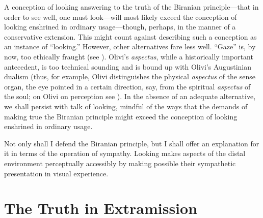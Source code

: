 A conception of looking answering to the truth of the Biranian principle---that in order to see well, one must look---will most likely exceed the conception of looking enshrined in ordinary usage---though, perhaps, in the manner of a conservative extension. This might count against describing such a conception as an instance of ``looking.'' However, other alternatives fare less well. ``Gaze'' is, by now, too ethically fraught (see \citealt{Jay:1994aa}). Olivi's \emph{aspectus}, while a historically important antecedent, is too technical sounding and is bound up with Olivi's Augustinian dualism (thus, for example, Olivi distinguishes the physical \emph{aspectus} of the sense organ, the eye pointed in a certain direction, say, from the spiritual \emph{aspectus} of the soul; on Olivi on perception see \citealt{Pasnau:1997aa,Silva:2010zh,Toivanen:2013ul}). In the absence of an adequate alternative, we shall persist with talk of looking, mindful of the ways that the demands of making true the Biranian principle might exceed the conception of looking enshrined in ordinary usage.

Not only shall I defend the Biranian principle, but I shall offer an explanation for it in terms of the operation of sympathy. Looking makes aspects of the distal environment perceptually accessibly by making possible their sympathetic presentation in visual experience.


\section{The Truth in Extramission} %
\label{sec:the_truth_in_extramission}

